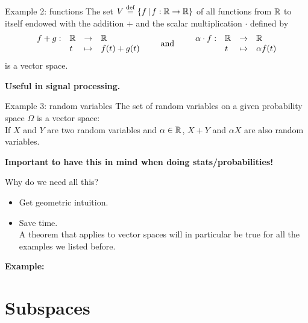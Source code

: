 \documentclass{beamer}
\begin{document}
\begin{frame}{Example 2: functions}
	The set $V \overset{\rm def}{=} \{ f \, | \, f: \mathbb{R} \to \mathbb{R} \}$ of all functions from $\mathbb{R}$ to itself endowed with the addition $+$ and the scalar multiplication $\cdot$ defined by
	$$
	\begin{array}{rlll}
		f+g :& \mathbb{R} & \to & \mathbb{R} \\
			 &t & \mapsto & f(t) + g(t)
	\end{array}
	\qquad
	\text{and}
	\qquad
	\begin{array}{rlll}
		\alpha \cdot f :& \mathbb{R} & \to & \mathbb{R} \\
						&t & \mapsto & \alpha f(t)
	\end{array}
	$$
	is a vector space.
	\vspace{0.4cm}
	\begin{center}
		\textbf{Useful in signal processing.}
	\end{center}
\end{frame}

\begin{frame}{Example 3: random variables}
	The set of random variables on a given probability space $\Omega$ is a vector space: 
	\\
	If $X$ and $Y$ are two random variables and $\alpha \in \mathbb{R}$, $X+Y$ and $\alpha X$ are also random variables.

	\vspace{0.8cm}
	\begin{center}
		\textbf{Important to have this in mind when doing stats/probabilities!}
	\end{center}
\end{frame}

\begin{frame}[t]{Why do we need all this?}
	\begin{itemize}
		\item Get geometric intuition. 
			\vspace{0.2cm}
		\item Save time. 
			\\
			A theorem that applies to vector spaces will in particular be true for all the examples we listed before.
	\end{itemize}
	\vspace{0.2cm}
	\textbf{Example:}
\end{frame}

\section{Subspaces}
\end{document}
